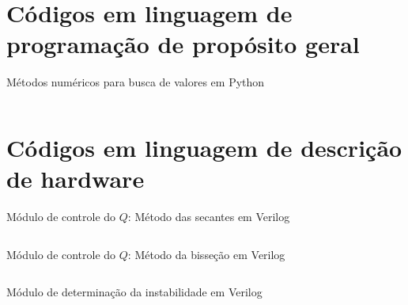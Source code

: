 \begin{anexosenv}

\partanexos

\chapter{Códigos em linguagem de programação de propósito geral}

\begin{code}
\caption{Métodos numéricos para busca de valores em Python}
\inputminted[frame=lines, linenos]{python}{code/methods_text.py}
\end{code}


\chapter{Códigos em linguagem de descrição de hardware}

\begin{code}
    \caption{Módulo de controle do $Q$: Método das secantes em Verilog}
    \inputminted[frame=lines, linenos]{verilog}{code/secant_text.v}
\end{code}

\begin{code}
    \caption{Módulo de controle do $Q$: Método da bisseção em Verilog}
    \inputminted[frame=lines, linenos]{verilog}{code/bisection_text.v}
\end{code}

\begin{code}
    \caption{Módulo de determinação da instabilidade em Verilog}
    \inputminted[frame=lines, linenos]{verilog}{code/instability_detect_text.v}
\end{code}


\end{anexosenv}

